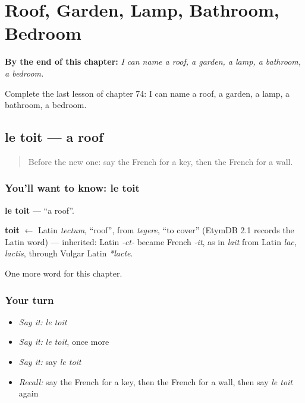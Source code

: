 
\chapter{Roof, Garden, Lamp, Bathroom, Bedroom}
\label{ch:fr-roof-garden-lamp-bathroom-bedroom}

\begin{chapteropening}
\textbf{By the end of this chapter:} \emph{I can name a roof, a garden, a lamp, a bathroom, a bedroom.}

Complete the last lesson of chapter 74: I can name a roof, a garden, a lamp, a bathroom, a bedroom.
\end{chapteropening}

\section[le toit]{le toit — a roof}

\label{lesson:FR-C74-toit}



\begin{quote}
Before the new one: say the French for a key, then the French for a wall.
\end{quote}

\subsection*{You'll want to know: le toit}
\textbf{le toit} — \textquotedblleft{}a roof\textquotedblright{}.

\begin{cousinweb}
\textbf{toit} $\leftarrow$ Latin \emph{tectum}, \textquotedblleft{}roof\textquotedblright{}, from \emph{tegere}, \textquotedblleft{}to cover\textquotedblright{} (EtymDB 2.1 records the Latin word) — inherited: Latin \emph{-ct-} became French \emph{-it}, as in \emph{lait} from Latin \emph{lac}, \emph{lactis}, through Vulgar Latin \emph{*lacte}.
\end{cousinweb}

\begin{grammarlens}[title={What you've built}]
One more word for this chapter.
\end{grammarlens}

\subsection*{Your turn}
\begin{itemize}
\raggedright
  \item \emph{Say it:} \emph{le toit}
  \item \emph{Say it:} \emph{le toit}, once more
  \item \emph{Say it:} say \emph{le toit}
  \item \emph{Recall:} say the French for a key, then the French for a wall, then say \emph{le toit} again
\end{itemize}

